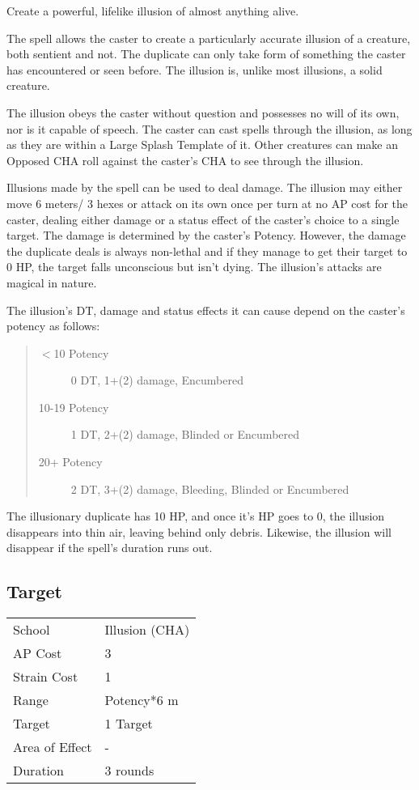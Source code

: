 \documentclass[11pt,a4paper,twocolumn]{book}
\begin{document}
\medskip

Create a powerful, lifelike illusion of almost anything alive.

The spell allows the caster to create a particularly accurate illusion of a creature, both sentient and not. The duplicate can only take form of something the caster has encountered or seen before. The illusion is, unlike most illusions, a solid creature.

The illusion obeys the caster without question and possesses no will of its own, nor is it capable of speech. The caster can cast spells through the illusion, as long as they are within a Large Splash Template of it. Other creatures can make an Opposed CHA roll against the caster's CHA to see through the illusion.

Illusions made by the spell can be used to deal damage. The illusion may either move 6 meters/ 3 hexes or attack on its own once per turn at no AP cost for the caster, dealing either damage or a status effect of the caster's choice to a single target. The damage is determined by the caster's Potency. However, the damage the duplicate deals is always non-lethal and if they manage to get their target to 0 HP, the target falls unconscious but isn't dying. The illusion's attacks are magical in nature.

The illusion's DT, damage and status effects it can cause depend on the caster's potency as follows:

\begin{quote}
	\begin{description}
		\item[$<$10 Potency]    0 DT, 1+(2) damage, Encumbered
		\item[10-19 Potency] 	1 DT, 2+(2) damage, Blinded or Encumbered
		\item[20+ Potency] 		2 DT, 3+(2) damage, Bleeding, Blinded or Encumbered
	\end{description}	
\end{quote}

The illusionary duplicate has 10 HP, and once it's HP goes to 0, the illusion disappears into thin air, leaving behind only debris. Likewise, the illusion will disappear if the spell's duration runs out.


\subsection*{Target}
{
	\begin{tabu} to 75mm{| X[l,4] | X[l,7] |}
		\hline
		School 			& Illusion (CHA) 		\\
		AP Cost	      	& 3 					\\
		Strain Cost     & 1 					\\
		Range     		& Potency*6 m 			\\
		Target      	& 1 Target				\\
		Area of Effect  & - 	 				\\
		Duration     	& 3 rounds				\\ \hline
	\end{tabu}
	
}
\end{document}
